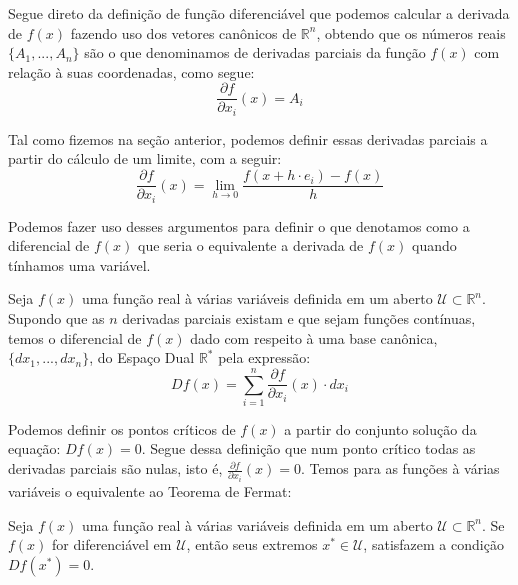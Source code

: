 \par Segue direto da definição de função diferenciável que podemos calcular a derivada de $f(x)$ fazendo uso dos vetores canônicos de $\mathbb{R}^n$, obtendo que os números reais $\{A_1, ..., A_n\}$ são o que denominamos de derivadas parciais da função $f(x)$ com relação à suas coordenadas, como segue:
\begin{equation}
  \frac{\partial f}{\partial x_i}(x) = A_i
\end{equation}

\par Tal como fizemos na seção anterior, podemos definir essas derivadas parciais a partir do cálculo de um limite, com a seguir:
\begin{equation}
  \frac{\partial f}{\partial x_i}(x) = \lim_{h \rightarrow 0}\frac{f(x+h \cdot e_i) - f(x)}{h}
\end{equation}
\par Podemos fazer uso desses argumentos para definir o que denotamos como a diferencial de $f(x)$ que seria o equivalente a derivada de $f(x)$ quando tínhamos uma variável. 

\begin{definition}[O Diferencial de $f(x)$]
  Seja $f(x)$ uma função real à várias variáveis definida em um aberto $\mathcal{U} \subset \mathbb{R}^n$. Supondo que as $n$ derivadas parciais existam e que sejam funções contínuas, temos o diferencial de $f(x)$ dado com respeito à uma base canônica,$\{dx_1, ..., dx_n\}$, do Espaço Dual $\mathbb{R}^*$ pela expressão:
  \begin{equation}
    Df(x) = \sum_{i=1}^{n} \frac{\partial f}{\partial x_i}(x)  \cdot dx_i
  \end{equation}
\end{definition}

\par Podemos definir os pontos críticos de $f(x)$ a partir do conjunto solução da equação: $Df(x) = 0$. Segue dessa definição que num ponto crítico todas as derivadas parciais são nulas, isto é, $\frac{\partial f}{\partial x_i}(x) = 0$. Temos para as funções à várias variáveis o equivalente ao Teorema de Fermat:


\begin{theorem}
  Seja $f(x)$ uma função real à várias variáveis definida em um aberto $\mathcal{U} \subset \mathbb{R}^n$. Se $f(x)$ for diferenciável em $\mathcal{U}$, então seus extremos $x^{*} \in \mathcal{U}$, satisfazem a condição $Df(x^*) = 0$. 
\end{theorem}

